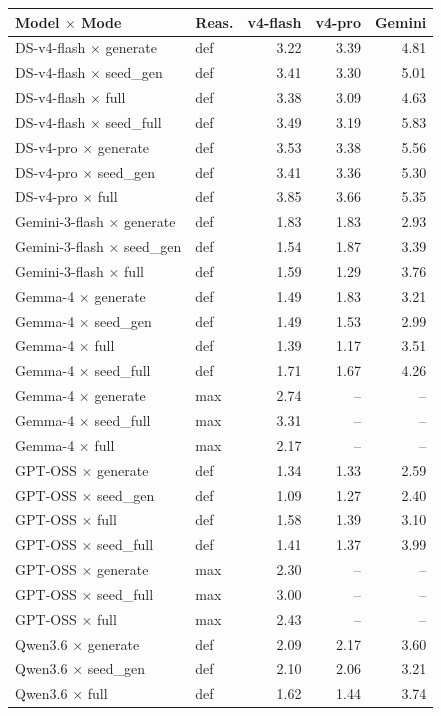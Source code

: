 \documentclass{article}
\begin{document}
\begin{table}[h]
  \centering
  \small
  \begin{tabular}{llrrr}
    \toprule
    Model $\times$ Mode & Reas. & v4-flash & v4-pro & Gemini \\
    \midrule
    DS-v4-flash $\times$ generate & def & 3.22 & 3.39 & 4.81 \\
    DS-v4-flash $\times$ seed\_gen & def & 3.41 & 3.30 & 5.01 \\
    DS-v4-flash $\times$ full & def & 3.38 & 3.09 & 4.63 \\
    DS-v4-flash $\times$ seed\_full & def & 3.49 & 3.19 & 5.83 \\
    DS-v4-pro $\times$ generate & def & 3.53 & 3.38 & 5.56 \\
    DS-v4-pro $\times$ seed\_gen & def & 3.41 & 3.36 & 5.30 \\
    DS-v4-pro $\times$ full & def & 3.85 & 3.66 & 5.35 \\
    Gemini-3-flash $\times$ generate & def & 1.83 & 1.83 & 2.93 \\
    Gemini-3-flash $\times$ seed\_gen & def & 1.54 & 1.87 & 3.39 \\
    Gemini-3-flash $\times$ full & def & 1.59 & 1.29 & 3.76 \\
    Gemma-4 $\times$ generate & def & 1.49 & 1.83 & 3.21 \\
    Gemma-4 $\times$ seed\_gen & def & 1.49 & 1.53 & 2.99 \\
    Gemma-4 $\times$ full & def & 1.39 & 1.17 & 3.51 \\
    Gemma-4 $\times$ seed\_full & def & 1.71 & 1.67 & 4.26 \\
    Gemma-4 $\times$ generate & max & 2.74 & -- & -- \\
    Gemma-4 $\times$ seed\_full & max & 3.31 & -- & -- \\
    Gemma-4 $\times$ full & max & 2.17 & -- & -- \\
    GPT-OSS $\times$ generate & def & 1.34 & 1.33 & 2.59 \\
    GPT-OSS $\times$ seed\_gen & def & 1.09 & 1.27 & 2.40 \\
    GPT-OSS $\times$ full & def & 1.58 & 1.39 & 3.10 \\
    GPT-OSS $\times$ seed\_full & def & 1.41 & 1.37 & 3.99 \\
    GPT-OSS $\times$ generate & max & 2.30 & -- & -- \\
    GPT-OSS $\times$ seed\_full & max & 3.00 & -- & -- \\
    GPT-OSS $\times$ full & max & 2.43 & -- & -- \\
    Qwen3.6 $\times$ generate & def & 2.09 & 2.17 & 3.60 \\
    Qwen3.6 $\times$ seed\_gen & def & 2.10 & 2.06 & 3.21 \\
    Qwen3.6 $\times$ full & def & 1.62 & 1.44 & 3.74 \\
    \bottomrule
  \end{tabular}
\end{table}
\end{document}

